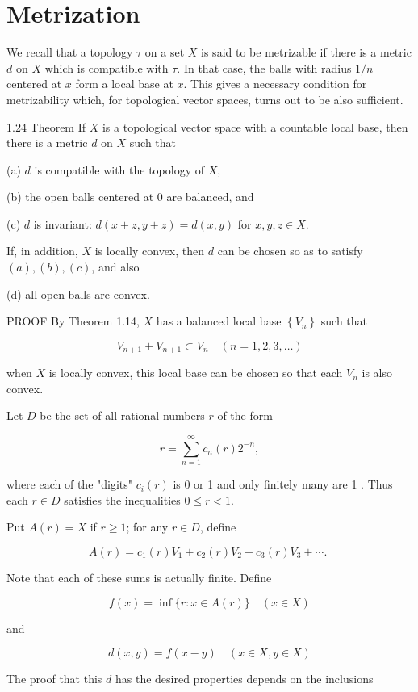 \documentclass[10pt]{article}
\begin{document}
\section{Metrization}
We recall that a topology $\tau$ on a set $X$ is said to be metrizable if there is a metric $d$ on $X$ which is compatible with $\tau$. In that case, the balls with radius $1 / n$ centered at $x$ form a local base at $x$. This gives a necessary condition for metrizability which, for topological vector spaces, turns out to be also sufficient.

1.24 Theorem If $X$ is a topological vector space with a countable local base, then there is a metric $d$ on $X$ such that

(a) $d$ is compatible with the topology of $X$,

(b) the open balls centered at 0 are balanced, and

(c) $d$ is invariant: $d(x+z, y+z)=d(x, y)$ for $x, y, z \in X$.

If, in addition, $X$ is locally convex, then $d$ can be chosen so as to satisfy $(a),(b),(c)$, and also

(d) all open balls are convex.

PROOF By Theorem 1.14, $X$ has a balanced local base $\left\{V_{n}\right\}$ such that

$$
V_{n+1}+V_{n+1} \subset V_{n} \quad(n=1,2,3, \ldots)
$$

when $X$ is locally convex, this local base can be chosen so that each $V_{n}$ is also convex.

Let $D$ be the set of all rational numbers $r$ of the form

$$
r=\sum_{n=1}^{\infty} c_{n}(r) 2^{-n},
$$

where each of the "digits" $c_{i}(r)$ is 0 or 1 and only finitely many are 1 . Thus each $r \in D$ satisfies the inequalities $0 \leq r<1$.

Put $A(r)=X$ if $r \geq 1$; for any $r \in D$, define

$$
A(r)=c_{1}(r) V_{1}+c_{2}(r) V_{2}+c_{3}(r) V_{3}+\cdots \text {. }
$$

Note that each of these sums is actually finite. Define

$$
f(x)=\inf \{r: x \in A(r)\} \quad(x \in X)
$$

and

$$
d(x, y)=f(x-y) \quad(x \in X, y \in X)
$$

The proof that this $d$ has the desired properties depends on the inclusions
\end{document}
